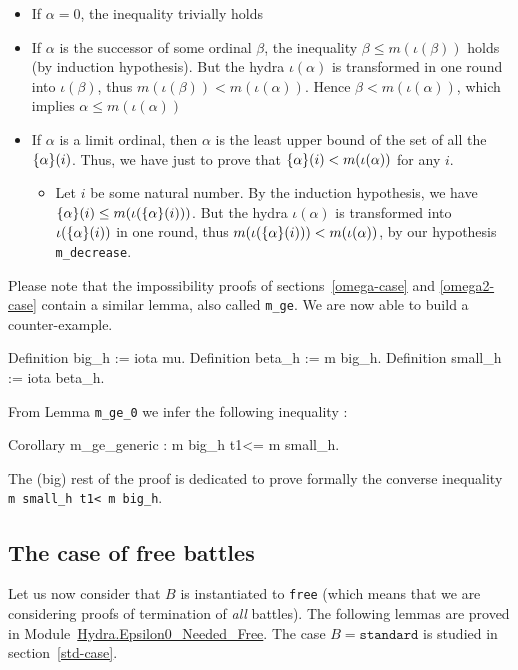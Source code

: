 \documentclass[a4paper]{book}
\begin{document}
\begin{itemize}
\item If $\alpha=0$, the inequality trivially holds
\item If $\alpha$ is the successor of  some ordinal $\beta$, the inequality $\beta \leq m(\iota(\beta))$ holds (by induction hypothesis). But the hydra $\iota(\alpha)$ is transformed in one round into 
$\iota(\beta)$, thus $m(\iota(\beta))<m(\iota(\alpha))$. Hence $\beta<m(\iota(\alpha))$, which implies $\alpha \leq m(\iota(\alpha))$
\item If $\alpha$ is a limit ordinal, then $\alpha$ is the least upper bound of the set
of all  the $\mbox{$\{\alpha\}(i)$}$.  Thus, we have just to prove that $\mbox{$\{\alpha\}(i)$}< m(\iota(\alpha))$ for any $i$. 
\begin{itemize}
\item Let $i$ be some natural number.
By the induction hypothesis, we have $\mbox{$\{\alpha\}(i)$} \leq m(\iota(\mbox{$\{\alpha\}(i)$}))$. But the hydra $\iota(\alpha)$ is transformed into $\iota(\mbox{$\{\alpha\}(i)$})$ in one round, thus $m(\iota(\mbox{$\{\alpha\}(i)$})) < m(\iota(\alpha))$, by our hypothesis \texttt{m\_decrease}.
\end{itemize}
\end{itemize}

Please note that the impossibility proofs of 
sections~\vref{omega-case} and \vref{omega2-case} contain a similar lemma, also called \texttt{m\_ge}.
We are now able to build a counter-example.

\begin{Coqsrc}
  Definition big_h := iota mu.
  Definition beta_h := m big_h.
  Definition small_h := iota beta_h.
\end{Coqsrc}
  
From Lemma \texttt{m\_ge\_0} we infer the following inequality :

\begin{Coqsrc}
    Corollary m_ge_generic : m big_h t1<= m small_h.
 \end{Coqsrc}

The (big) rest of the proof is dedicated to prove formally the converse inequality 
\texttt{m small\_h t1< m big\_h}. 



\subsection{The case of free battles}
\label{sec:free-battles-case}
Let us now consider that $B$ is instantiated to \texttt{free} (which means that we are considering proofs of termination of \emph{all} battles). The following lemmas are proved in Module~\href{../src/html/hydras.Hydra.Epsilon0_Needed_Free.html}{Hydra.Epsilon0\_Needed\_Free}.
The case $B=\texttt{standard}$ is studied in section~\vref{std-case}.
\end{document}
